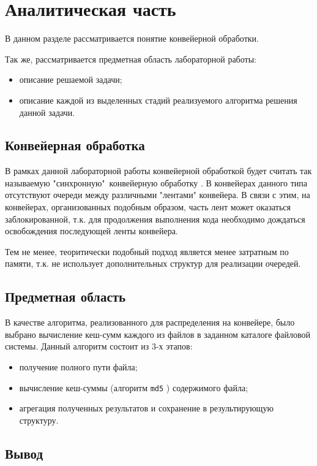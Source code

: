 \chapter{Аналитическая часть}

В данном разделе рассматривается понятие конвейерной обработки. 

Так же, рассматривается предметная область лабораторной работы:
\begin{itemize}
    \item описание решаемой задачи;
    \item описание каждой из выделенных стадий реализуемого алгоритма решения данной задачи.
\end{itemize}

\section{Конвейерная обработка}

В рамках данной лабораторной работы конвейерной обработкой будет считать так называемую "синхронную"\ конвейерную обработку \cite{kormen}. В конвейерах данного типа отсутствуют очереди между различными "лентами" конвейера. В связи с этим, на конвейерах, организованных подобным образом, часть лент может оказаться заблокированной, т.к. для продолжения выполнения кода необходимо дождаться освобождения последующей ленты конвейера. 

Тем не менее, теоритически подобный подход является менее затратным по памяти, т.к. не использует дополнительных структур для реализации очередей.

\section{Предметная область}

В качестве алгоритма, реализованного для распределения на конвейере, было выбрано вычисление кеш-сумм каждого из файлов в заданном каталоге файловой системы. Данный алгоритм состоит из 3-х этапов:
\begin{itemize}
\item получение полного пути файла;
\item вычисление кеш-суммы (алгоритм \texttt{md5} \cite{md5}) содержимого файла;
\item агрегация полученных результатов и сохранение в результирующую структуру.
\end{itemize}

\section{Вывод}

